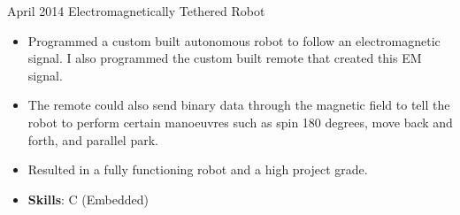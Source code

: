 \documentclass[]{friggeri-cv} %
\begin{document}
\begin{entrylist}
{}
\entry
{April 2014}
{Electromagnetically Tethered Robot}
{
\begin{itemize}
\item Programmed a custom built autonomous robot to follow an electromagnetic
signal. I also programmed the custom built remote that created this EM signal.
\item The remote could also send binary data through the magnetic field to tell
the robot to perform certain manoeuvres such as spin 180 degrees, move back and
forth, and parallel park.
\item Resulted in a fully functioning robot and a high project grade.
\item {\bf Skills}: C (Embedded)\\
\end{itemize}
}
\end{entrylist}








\end{document}
